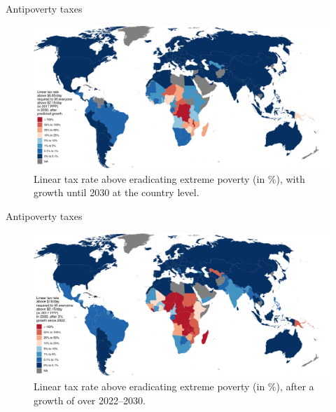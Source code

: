 \documentclass[aspectratio=169,xcolor=dvipsnames, 11pt,mathserif]{beamer}
\begin{document}
\begin{frame}{Antipoverty taxes}    
    \begin{figure}
      \caption{Linear tax rate above  eradicating extreme poverty (in \%), with growth until 2030  at the country level. 
      }
      \includegraphics[height=.8\textheight]{../figures/antipoverty_2_tax_7_reg.pdf}
    \end{figure}
\end{frame}

\begin{frame}{Antipoverty taxes}    
    \begin{figure}
      \caption{Linear tax rate above  eradicating extreme poverty (in \%), after a growth of  over 2022--2030. 
      }
      \includegraphics[height=.8\textheight]{../figures/antipoverty_2_tax_18_average.pdf}
    \end{figure}
\end{frame}
\end{document}
